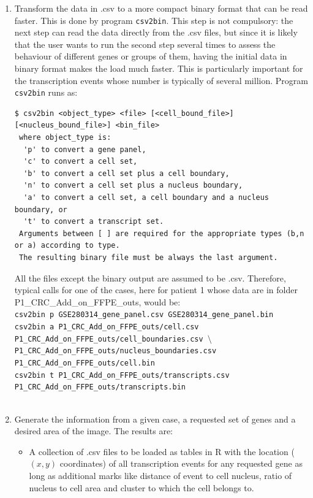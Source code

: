 \documentclass[11pt]{report}
\begin{document}
\begin{enumerate}
\item Transform the data in .csv to a more compact binary format that can be read faster. This is done by program {\tt csv2bin}. This step is not
compulsory: the next step can read the data directly from the .csv files, but since it is likely that the user wants to run the second step several times
to assess the behaviour of different genes or groups of them, having the initial data in binary format makes the load much faster. This is particularly
important for the transcription events whose number is typically of several million. Program {\tt csv2bin} runs as:
\begin{verbatim}
$ csv2bin <object_type> <file> [<cell_bound_file>] [<nucleus_bound_file>] <bin_file>
 where object_type is:
  'p' to convert a gene panel,
  'c' to convert a cell set,
  'b' to convert a cell set plus a cell boundary,
  'n' to convert a cell set plus a nucleus boundary,
  'a' to convert a cell set, a cell boundary and a nucleus boundary, or
  't' to convert a transcript set.
 Arguments between [ ] are required for the appropriate types (b,n or a) according to type.
 The resulting binary file must be always the last argument.
\end{verbatim}
All the files except the binary output are assumed to be .csv. Therefore, typical calls for one of the cases, here for patient 1 whose data are in folder
P1\_CRC\_Add\_on\_FFPE\_outs, would be:
\ \\
\verb|csv2bin p GSE280314_gene_panel.csv GSE280314_gene_panel.bin|\\
\verb|csv2bin a P1_CRC_Add_on_FFPE_outs/cell.csv P1_CRC_Add_on_FFPE_outs/cell_boundaries.csv |$\setminus$
\verb|          P1_CRC_Add_on_FFPE_outs/nucleus_boundaries.csv P1_CRC_Add_on_FFPE_outs/cell.bin|\\
\verb|csv2bin t P1_CRC_Add_on_FFPE_outs/transcripts.csv P1_CRC_Add_on_FFPE_outs/transcripts.bin|\\
\ \\
\item Generate the information from a given case, a requested set of genes and a desired area of the image. The results are:
\begin{itemize}
\item A collection of .csv files to be loaded as tables in R with the location ($(x,y)$ coordinates) of all transcription events for any requested
gene as long as additional marks like distance of event to cell nucleus, ratio of nucleus to cell area and cluster to which the cell belongs to.

\end{itemize}
\end{enumerate}
\end{document}
